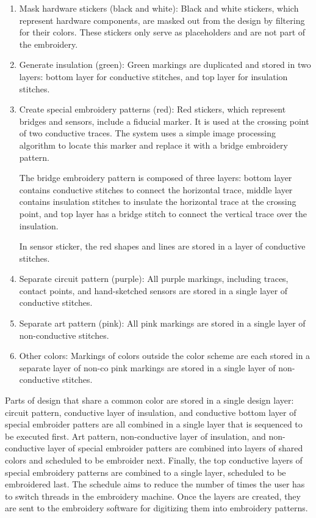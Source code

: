 \begin{enumerate}
\item{Mask hardware stickers (black and white):} Black and white stickers, which represent hardware components, are masked out from the design by filtering for their colors. These stickers only serve as placeholders and are not part of the embroidery.

\item{Generate insulation (green):} Green markings are duplicated and stored in two layers: bottom layer for conductive stitches, and top layer for insulation stitches.

\item{Create special embroidery patterns (red):}
Red stickers, which represent bridges and sensors, include a fiducial marker. It is used at the crossing point of two conductive traces. The system uses a simple image processing algorithm to locate this marker and replace it with a bridge embroidery pattern. 

The bridge embroidery pattern is composed of three layers: bottom layer contains conductive stitches to connect the horizontal trace, middle layer contains insulation stitches to insulate the horizontal trace at the crossing point, and top layer has a bridge stitch to connect the vertical trace over the insulation.

In sensor sticker, the red shapes and lines are stored in a layer of conductive stitches.

\item{Separate circuit pattern (purple):} All purple markings, including traces, contact points, and hand-sketched sensors are stored in a single layer of conductive stitches. 

\item{Separate art pattern (pink):} All pink markings are stored in a single layer of non-conductive stitches.  

\item{Other colors:} Markings of colors outside the color scheme are each stored in a separate layer of non-co pink markings are stored in a single layer of non-conductive stitches.  

\end{enumerate}

Parts of design that share a common color are stored in a single design layer: circuit pattern, conductive layer of insulation, and conductive bottom layer of special embroider patters are all combined in a single layer that is sequenced to be executed first. Art pattern, non-conductive layer of insulation, and non-conductive layer of special embroider patters are combined into layers of shared colors and scheduled to be embroider next. Finally, the top conductive layers of special embroidery patterns are combined to a single layer, scheduled to be embroidered last. The schedule aims to reduce the number of times the user has to switch threads in the embroidery machine. Once the layers are created, they are sent to the embroidery software for digitizing them into embroidery patterns.

